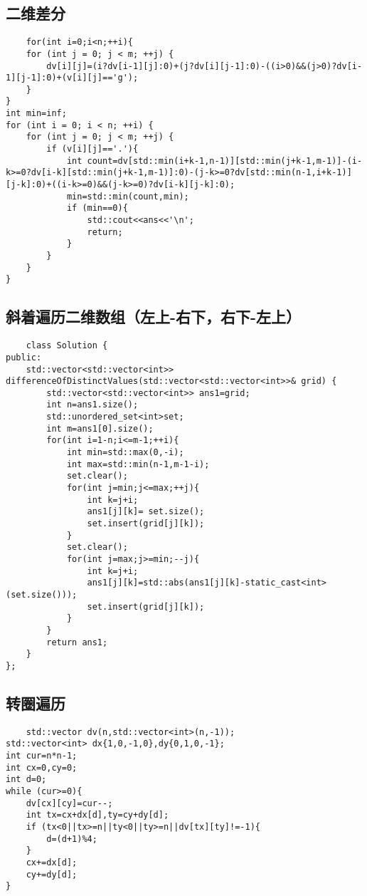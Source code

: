 \documentclass[UTF8]{ctexart}
\begin{document}
\subsection{二维差分}
\begin{lstlisting}
    for(int i=0;i<n;++i){
    for (int j = 0; j < m; ++j) {
        dv[i][j]=(i?dv[i-1][j]:0)+(j?dv[i][j-1]:0)-((i>0)&&(j>0)?dv[i-1][j-1]:0)+(v[i][j]=='g');
    }
}
int min=inf;
for (int i = 0; i < n; ++i) {
    for (int j = 0; j < m; ++j) {
        if (v[i][j]=='.'){
            int count=dv[std::min(i+k-1,n-1)][std::min(j+k-1,m-1)]-(i-k>=0?dv[i-k][std::min(j+k-1,m-1)]:0)-(j-k>=0?dv[std::min(n-1,i+k-1)][j-k]:0)+((i-k>=0)&&(j-k>=0)?dv[i-k][j-k]:0);
            min=std::min(count,min);
            if (min==0){
                std::cout<<ans<<'\n';
                return;
            }
        }
    }
}
\end{lstlisting}
\subsection{斜着遍历二维数组（左上-右下，右下-左上）}
\begin{lstlisting}
    class Solution {
public:
    std::vector<std::vector<int>> differenceOfDistinctValues(std::vector<std::vector<int>>& grid) {
        std::vector<std::vector<int>> ans1=grid;
        int n=ans1.size();
        std::unordered_set<int>set;
        int m=ans1[0].size();
        for(int i=1-n;i<=m-1;++i){
            int min=std::max(0,-i);
            int max=std::min(n-1,m-1-i);
            set.clear();
            for(int j=min;j<=max;++j){
                int k=j+i;
                ans1[j][k]= set.size();
                set.insert(grid[j][k]);
            }
            set.clear();
            for(int j=max;j>=min;--j){
                int k=j+i;
                ans1[j][k]=std::abs(ans1[j][k]-static_cast<int>(set.size()));
                set.insert(grid[j][k]);
            }
        }
        return ans1;
    }
};
\end{lstlisting}
\subsection{转圈遍历}
\begin{lstlisting}
    std::vector dv(n,std::vector<int>(n,-1));
std::vector<int> dx{1,0,-1,0},dy{0,1,0,-1};
int cur=n*n-1;
int cx=0,cy=0;
int d=0;
while (cur>=0){
    dv[cx][cy]=cur--;
    int tx=cx+dx[d],ty=cy+dy[d];
    if (tx<0||tx>=n||ty<0||ty>=n||dv[tx][ty]!=-1){
        d=(d+1)%4;
    }
    cx+=dx[d];
    cy+=dy[d];
}
\end{lstlisting}
\end{document}
